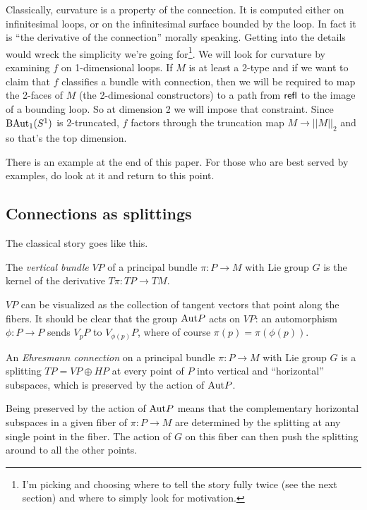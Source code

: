 Classically, curvature is a property of the connection. It is computed either on infinitesimal loops, or on the infinitesimal surface bounded by the loop. In fact it is ``the derivative of the connection'' morally speaking. Getting into the details would wreck the simplicity we're going for\footnote{I'm picking and choosing where to tell the story fully twice (see the next section) and where to simply look for motivation.}. We will look for curvature by examining \( f \) on 1-dimensional loops. If \( M \) is at least a 2-type and if we want to claim that \( f \) classifies a bundle with connection, then we will be required to map the 2-faces of \( M \) (the 2-dimesional constructors) to a path from \( \mathsf{refl} \) to the image of a bounding loop. So at dimension 2 we will impose that constraint. Since \( \mathrm{BAut}_1(S^1) \) is 2-truncated, \( f \) factors through the truncation map \( M\to||M||_2 \) and so that's the top dimension.

There is an example at the end of this paper. For those who are best served by examples, do look at it and return to this point.



\subsection{Connections as splittings}

The classical story goes like this.

\begin{mydef}
The \emph{vertical bundle} \( VP \) of a principal bundle \( \pi:P\to M \) with Lie group \( G \) is the kernel of the derivative \( T\pi:TP\to TM \). 
\end{mydef}

\( VP \) can be visualized as the collection of tangent vectors that point along the fibers. It should be clear that the group \( \mathrm{Aut} P \) acts on \( VP \): an automorphism \( \phi:P\to P \) sends \( V_pP \) to \( V_{\phi(p)}P \), where of course \( \pi(p)=\pi(\phi(p)) \).

\begin{mydef}
An \emph{Ehresmann connection} on a principal bundle \( \pi:P\to M \) with Lie group \( G \) is a splitting \( TP=VP\oplus HP \) at every point of \( P \) into vertical and ``horizontal'' subspaces, which is preserved by the action of \( \mathrm{Aut} P \).
\end{mydef}

Being preserved by the action of \( \mathrm{Aut} P \) means that the complementary horizontal subspaces in a given fiber of \( \pi:P\to M \) are determined by the splitting at any single point in the fiber. The action of \( G \) on this fiber can then push the splitting around to all the other points.

